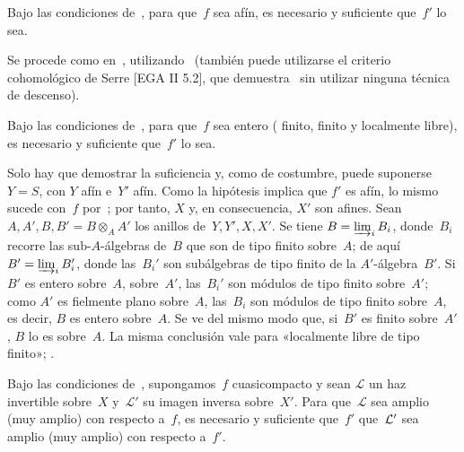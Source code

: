 \begin{corollaire}
\label{VIII.5.6}
Bajo las condiciones de~, para que~$f$ sea afín, es necesario
y suficiente que~$f'$ lo sea.
\end{corollaire}

Se procede como en~, utilizando~ (también
puede utilizarse el criterio cohomológico de Serre [EGA II 5.2], que
demuestra~ sin utilizar ninguna técnica de descenso).

\begin{corollaire}
\label{VIII.5.7}
Bajo las condiciones de~, para que~$f$ sea entero (\resp
finito, \resp finito y localmente libre), es necesario y suficiente
que~$f'$ lo sea.
\end{corollaire}

Solo hay que demostrar la suficiencia y, como de costumbre, puede
suponerse $Y=S$, con $Y$ afín e~$Y'$ afín. Como la hipótesis implica que
$f'$ es afín, lo mismo sucede con~$f$ por~; por tanto, $X$
y, en consecuencia, $X'$ son afines. Sean~$A,A',B,B'=B\otimes_{A}A'$ los
anillos de~$Y,Y',X,X'$. Se tiene $B=\varinjlim_i B_{i}$, donde~$B_{i}$
recorre las sub-$A$-álgebras de~$B$ que son de tipo finito sobre~$A$; de
aquí $B'=\varinjlim_i B_{i}'$, donde las~$B_{i}'$ son subálgebras de tipo
finito de la $A'$-álgebra~$B'$. Si $B'$ es entero
{sobre~$A$,}
{sobre~$A'$,}
las~$B_{i}'$ son módulos de tipo finito sobre~$A'$; como $A'$ es fielmente
plano sobre~$A$, las~$B_{i}$ son módulos de tipo finito sobre~$A$, es decir,
$B$ es entero sobre~$A$. Se ve del mismo modo que, si~$B'$ es finito
sobre~$A'$, $B$ lo es sobre~$A$. La misma conclusión vale para «localmente
libre de tipo finito»; \cf {}.

\begin{corollaire}
\label{VIII.5.8}
Bajo
las condiciones de~, supongamos~$f$ cuasicompacto y sean
$\mathcal{L}$ un haz invertible sobre~$X$ y~$\mathcal{L}'$ su imagen
inversa sobre~$X'$. Para que~$\mathcal{L}$ sea amplio (\resp muy amplio)
con respecto a~$f$, es necesario y suficiente
{que~$f'$}
{que~$\cal{L}'$}
sea amplio (\resp muy amplio) con respecto a~$f'$.
\end{corollaire}

